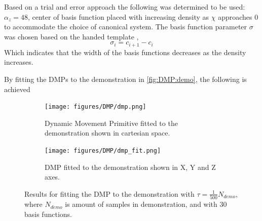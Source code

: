 \documentclass[../main.tex]{subfiles}
\begin{document}
Based on a trial and error approach the following was determined to be used: $\alpha_z = 48$, center of basis function placed with increasing density as $\chi$ approaches $0$ to accommodate the choice of canonical system. The basis function parameter $\sigma$ was chosen based on the handed template \cite{inigo},
\begin{equation}
    \sigma_i = c_{i+1} - c_i
\end{equation}
Which indicates that the width of the basis functions decreases as the density increases.

By fitting the DMPs to the demonstration in \autoref{fig:DMP:demo}, the following is achieved
\begin{figure}[H]
    \centering
    \begin{subfigure}[b]{0.48\textwidth}
        \centering
        \texttt{[image: figures/DMP/dmp.png]}
        \caption{Dynamic Movement Primitive fitted to the demonstration shown in cartesian space.}
        \label{fig:dmp:fit:cartesian}
    \end{subfigure}
    \hfill
    \begin{subfigure}[b]{0.48\textwidth}
        \centering
        \texttt{[image: figures/DMP/dmp\_fit.png]}
        \caption{DMP fitted to the demonstration shown in X, Y and Z axes.}
        \label{fig:dmp:fit:xyz}
    \end{subfigure}
    \caption{Results for fitting the DMP to the demonstration with $\tau = \frac{1}{500} N_{demo}$, where $N_{demo}$ is amount of samples in demonstration, and with 30 basis functions.}
    \label{fig:dmp:fit}
\end{figure}
\end{document}
